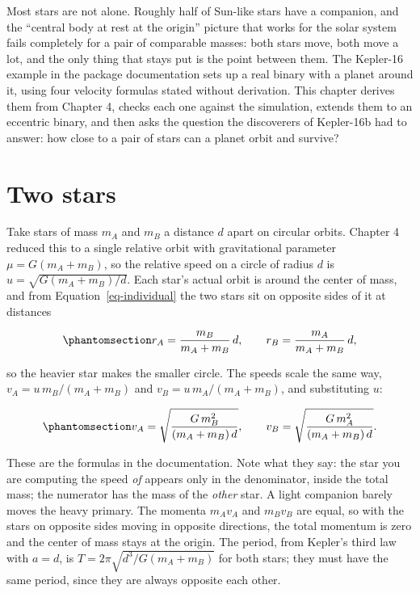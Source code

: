 \documentclass[
  10.5pt,
  letterpaper,
]{scrbook}
\theoremstyle{plain}
\theoremstyle{remark}
\begin{document}
Most stars are not alone. Roughly half of Sun-like stars have a
companion, and the ``central body at rest at the origin'' picture that
works for the solar system fails completely for a pair of comparable
masses: both stars move, both move a lot, and the only thing that stays
put is the point between them. The Kepler-16 example in the package
documentation sets up a real binary with a planet around it, using four
velocity formulas stated without derivation. This chapter derives them
from Chapter 4, checks each one against the simulation, extends them to
an eccentric binary, and then asks the question the discoverers of
Kepler-16b had to answer: how close to a pair of stars can a planet
orbit and survive?

\section{Two stars}\label{two-stars}

Take stars of mass \(m_A\) and \(m_B\) a distance \(d\) apart on
circular orbits. Chapter 4 reduced this to a single relative orbit with
gravitational parameter \(\mu = G(m_A + m_B)\), so the relative speed on
a circle of radius \(d\) is \(u = \sqrt{G(m_A+m_B)/d}\). Each star's
actual orbit is around the center of mass, and from
Equation~\ref{eq-individual} the two stars sit on opposite sides of it
at distances

\begin{equation}\protect\phantomsection\label{eq-binary-radii}{
r_A = \frac{m_B}{m_A + m_B}\,d, \qquad r_B = \frac{m_A}{m_A + m_B}\,d,
}\end{equation}

so the heavier star makes the smaller circle. The speeds scale the same
way, \(v_A = u\,m_B/(m_A+m_B)\) and \(v_B = u\,m_A/(m_A+m_B)\), and
substituting \(u\):

\begin{equation}\protect\phantomsection\label{eq-binary-speeds}{
v_A = \sqrt{\frac{G\,m_B^2}{(m_A + m_B)\,d}}, \qquad
v_B = \sqrt{\frac{G\,m_A^2}{(m_A + m_B)\,d}}.
}\end{equation}

These are the formulas in the documentation. Note what they say: the
star you are computing the speed \emph{of} appears only in the
denominator, inside the total mass; the numerator has the mass of the
\emph{other} star. A light companion barely moves the heavy primary. The
momenta \(m_A v_A\) and \(m_B v_B\) are equal, so with the stars on
opposite sides moving in opposite directions, the total momentum is zero
and the center of mass stays at the origin. The period, from Kepler's
third law with \(a = d\), is \(T = 2\pi\sqrt{d^3/G(m_A+m_B)}\) for both
stars; they must have the same period, since they are always opposite
each other.
\end{document}
